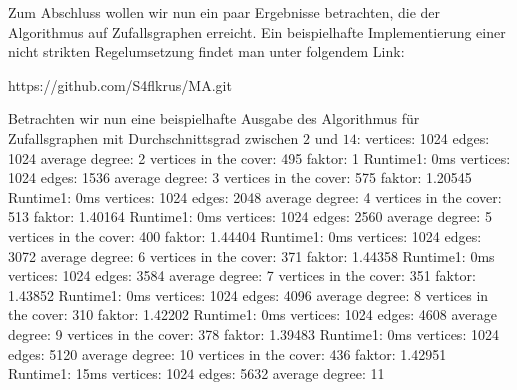 \documentclass[12pt,onecolumn, notitlepage]{scrartcl}
\begin{document}
Zum Abschluss wollen wir nun ein paar Ergebnisse betrachten, die der Algorithmus auf Zufallsgraphen erreicht. \newline
Ein beispielhafte Implementierung einer nicht strikten Regelumsetzung findet man unter folgendem Link:\newline\newline
\begin{Huge}
https://github.com/S4flkrus/MA.git
\end{Huge}
\newline\newline
Betrachten wir nun eine beispielhafte Ausgabe des Algorithmus für Zufallsgraphen mit Durchschnittsgrad zwischen $2$ und $14$: \newline
\newline vertices: 1024 edges: 1024 average degree: 2 
\newline vertices in the cover: 495 faktor: 1 Runtime1: 0ms 
\newline vertices: 1024 edges: 1536 average degree: 3 
\newline vertices in the cover: 575 faktor: 1.20545 Runtime1: 0ms
\newline vertices: 1024 edges: 2048 average degree: 4 
\newline vertices in the cover: 513 faktor: 1.40164 Runtime1: 0ms
\newline vertices: 1024 edges: 2560 average degree: 5 
\newline vertices in the cover: 400 faktor: 1.44404 Runtime1: 0ms
\newline vertices: 1024 edges: 3072 average degree: 6 
\newline vertices in the cover: 371 faktor: 1.44358 Runtime1: 0ms
\newline vertices: 1024 edges: 3584 average degree: 7 
\newline vertices in the cover: 351 faktor: 1.43852 Runtime1: 0ms
\newline vertices: 1024 edges: 4096 average degree: 8 
\newline vertices in the cover: 310 faktor: 1.42202 Runtime1: 0ms
\newline vertices: 1024 edges: 4608 average degree: 9 
\newline vertices in the cover: 378 faktor: 1.39483 Runtime1: 0ms
\newline vertices: 1024 edges: 5120 average degree: 10 
\newline vertices in the cover: 436 faktor: 1.42951 Runtime1: 15ms
\newline vertices: 1024 edges: 5632 average degree: 11 
\end{document}
